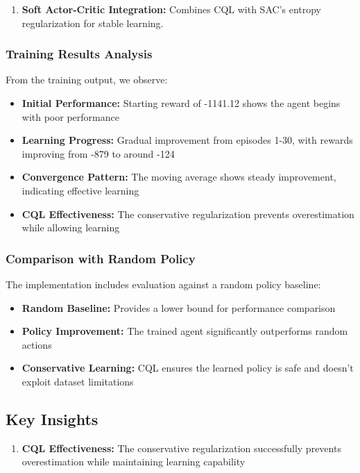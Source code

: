 \documentclass[12pt]{article}
\begin{document}
{{\begin{enumerate}
    \item \textbf{Soft Actor-Critic Integration:} Combines CQL with SAC's entropy regularization for stable learning.
\end{enumerate}

\subsubsection{Training Results Analysis}

From the training output, we observe:
\begin{itemize}
    \item \textbf{Initial Performance:} Starting reward of -1141.12 shows the agent begins with poor performance
    \item \textbf{Learning Progress:} Gradual improvement from episodes 1-30, with rewards improving from -879 to around -124
    \item \textbf{Convergence Pattern:} The moving average shows steady improvement, indicating effective learning
    \item \textbf{CQL Effectiveness:} The conservative regularization prevents overestimation while allowing learning
\end{itemize}

\subsubsection{Comparison with Random Policy}

The implementation includes evaluation against a random policy baseline:
\begin{itemize}
    \item \textbf{Random Baseline:} Provides a lower bound for performance comparison
    \item \textbf{Policy Improvement:} The trained agent significantly outperforms random actions
    \item \textbf{Conservative Learning:} CQL ensures the learned policy is safe and doesn't exploit dataset limitations
\end{itemize}

\subsection{Key Insights}

\begin{enumerate}
    \item \textbf{CQL Effectiveness:} The conservative regularization successfully prevents overestimation while maintaining learning capability
    

\end{enumerate}}}
\end{document}
